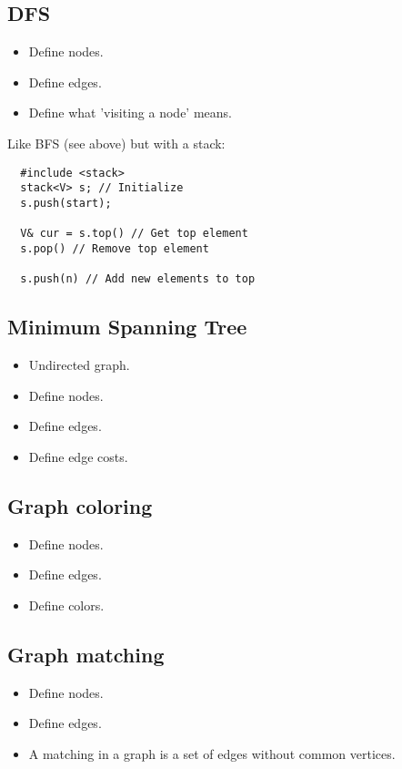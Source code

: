 \documentclass[guide.tex]{subfiles}
\begin{document}
\subsection{DFS}
\begin{itemize}
  \item Define nodes.
  \item Define edges.
  \item Define what 'visiting a node' means.
\end{itemize}

Like BFS (see above) but with a stack:
\begin{verbatim}
  #include <stack>
  stack<V> s; // Initialize
  s.push(start);

  V& cur = s.top() // Get top element
  s.pop() // Remove top element

  s.push(n) // Add new elements to top
\end{verbatim}

\subsection{Minimum Spanning Tree}
\begin{itemize}
  \item Undirected graph.
  \item Define nodes.
  \item Define edges.
  \item Define edge costs.
\end{itemize}

\subsection{Graph coloring}
\begin{itemize}
  \item Define nodes.
  \item Define edges.
  \item Define colors.
\end{itemize}

\subsection{Graph matching}
\begin{itemize}
  \item Define nodes.
  \item Define edges.
  \item A matching in a graph is a set of edges without common vertices.
\end{itemize}
\end{document}
